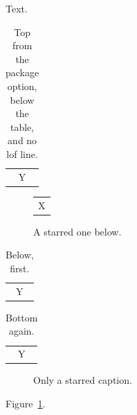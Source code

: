 \documentclass{article}
\begin{document}
Text.
\begin{table}[h]
\begin{tabular}{c}Y\end{tabular}
\caption[]{Top from the package option, below the table, and no lof line.}
\end{table}
\begin{figure}[h]
\caption[Short]{Auto on top, a long caption that is wider than the line so it must break into a paragraph of more than one line.}
\label{fig:a}
\centering
\begin{tabular}{c}X\end{tabular}
\caption*{A starred one below.}
\end{figure}
\begin{table}[h]
\captionsetup{position=below,list=false}
\caption{Below, first.}
\begin{tabular}{c}Y\end{tabular}
\end{table}
\begin{table}[h]
\captionsetup{position=above}
\begin{tabular}{c}Y\end{tabular}
\caption{Above, after the table.}
\captionsetup{position=bottom}
\caption{Bottom again.}
\end{table}
\begin{figure}[h]
\caption*{Only a starred caption.}
\end{figure}
Figure~\ref{fig:a}.
\end{document}
